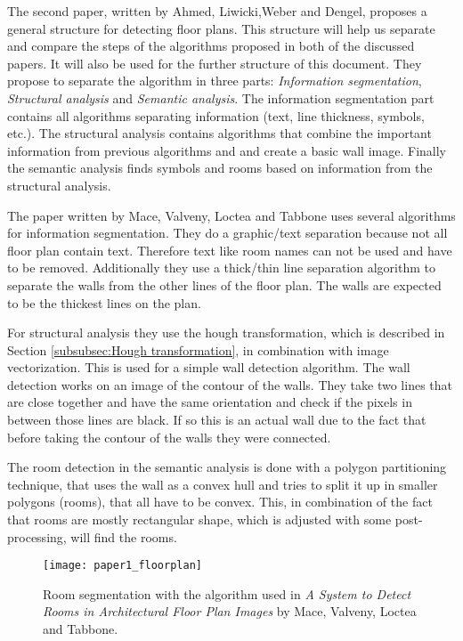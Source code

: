 The second paper, written by Ahmed, Liwicki,Weber and Dengel, proposes a general structure for detecting floor plans. This structure will help us separate and compare the steps of the algorithms proposed in both of the discussed papers. It will also be used for the further structure of this document. They propose to separate the algorithm in three parts: \textit{Information segmentation}, \textit{Structural analysis} and \textit{Semantic analysis}. The information segmentation part contains all algorithms separating information (text, line thickness, symbols, etc.). The structural analysis contains algorithms that combine the important information from previous algorithms and and create a basic wall image. Finally the semantic analysis finds symbols and rooms based on information from the structural analysis.

The paper written by Mace, Valveny, Loctea and Tabbone uses several algorithms for information segmentation. They do a graphic/text separation because not all floor plan contain text. Therefore text like room names can not be used and have to be removed. Additionally they use a thick/thin line separation algorithm to separate the walls from the other lines of the floor plan. The walls are expected to be the thickest lines on the plan.

For structural analysis they use the hough transformation, which is described in Section \ref{subsubsec:Hough transformation}, in combination with image vectorization. This is used for a simple wall detection algorithm. The wall detection works on an image of the contour of the walls. They take two lines that are close together and have the same orientation and check if the pixels in between those lines are black. If so this is an actual wall due to the fact that before taking the contour of the walls they were connected. 

The room detection in the semantic analysis is done with a polygon partitioning technique, that uses the wall as a convex hull and tries to split it up in smaller polygons (rooms), that all have to be convex. This, in combination of the fact that rooms are mostly rectangular shape, which is adjusted with some post-processing, will find the rooms.

\begin{figure}[H]
	\centering
	\texttt{[image: paper1\_floorplan]}
	\caption{Room segmentation with the algorithm used in \textit{A System to Detect Rooms in Architectural Floor Plan Images} by Mace, Valveny, Loctea and Tabbone. }
	\label{fig:paper1_floorplan}
\end{figure}

